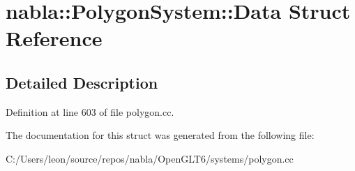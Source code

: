 \hypertarget{structnabla_1_1_polygon_system_1_1_data}{}\section{nabla\+::Polygon\+System\+::Data Struct Reference}
\label{structnabla_1_1_polygon_system_1_1_data}


\subsection{Detailed Description}


Definition at line 603 of file polygon.\+cc.



The documentation for this struct was generated from the following file\+:\begin{DoxyCompactItemize}
\item 
C\+:/\+Users/leon/source/repos/nabla/\+Open\+G\+L\+T6/systems/polygon.\+cc\end{DoxyCompactItemize}
